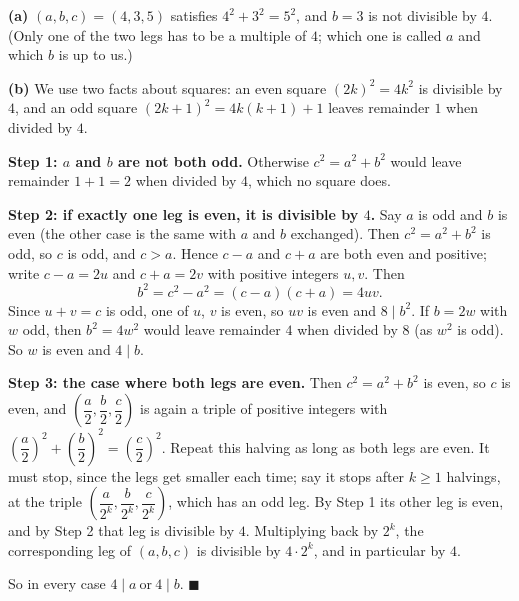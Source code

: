\textbf{(a)} $(a,b,c)=(4,3,5)$ satisfies $4^2+3^2=5^2$, and $b=3$ is not divisible by $4$. (Only one of the two legs has to be a multiple of $4$; which one is called $a$ and which $b$ is up to us.)

\textbf{(b)} We use two facts about squares: an even square $(2k)^2=4k^2$ is divisible by $4$, and an odd square $(2k+1)^2=4k(k+1)+1$ leaves remainder $1$ when divided by $4$.

\textbf{Step 1: $a$ and $b$ are not both odd.} Otherwise $c^2=a^2+b^2$ would leave remainder $1+1=2$ when divided by $4$, which no square does.

\textbf{Step 2: if exactly one leg is even, it is divisible by $4$.} Say $a$ is odd and $b$ is even (the other case is the same with $a$ and $b$ exchanged). Then $c^2=a^2+b^2$ is odd, so $c$ is odd, and $c>a$. Hence $c-a$ and $c+a$ are both even and positive; write $c-a=2u$ and $c+a=2v$ with positive integers $u,v$. Then
\[b^2=c^2-a^2=(c-a)(c+a)=4uv .\]
Since $u+v=c$ is odd, one of $u$, $v$ is even, so $uv$ is even and $8\mid b^2$. If $b=2w$ with $w$ odd, then $b^2=4w^2$ would leave remainder $4$ when divided by $8$ (as $w^2$ is odd). So $w$ is even and $4\mid b$.

\textbf{Step 3: the case where both legs are even.} Then $c^2=a^2+b^2$ is even, so $c$ is even, and $\left(\dfrac a2,\dfrac b2,\dfrac c2\right)$ is again a triple of positive integers with $\left(\dfrac a2\right)^2+\left(\dfrac b2\right)^2=\left(\dfrac c2\right)^2$. Repeat this halving as long as both legs are even. It must stop, since the legs get smaller each time; say it stops after $k\ge1$ halvings, at the triple $\left(\dfrac{a}{2^k},\dfrac{b}{2^k},\dfrac{c}{2^k}\right)$, which has an odd leg. By Step 1 its other leg is even, and by Step 2 that leg is divisible by $4$. Multiplying back by $2^k$, the corresponding leg of $(a,b,c)$ is divisible by $4\cdot2^k$, and in particular by $4$.

So in every case $\boxed{4\mid a\ \text{or}\ 4\mid b}$. $\blacksquare$
